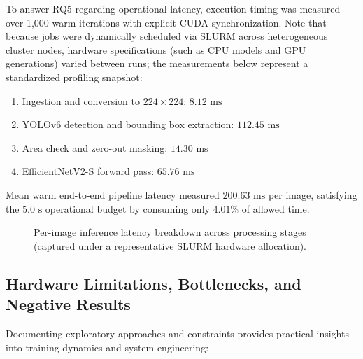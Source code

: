 To answer RQ5 regarding operational latency, execution timing was measured over 1,000 warm iterations with explicit CUDA synchronization. Note that because jobs were dynamically scheduled via SLURM across heterogeneous cluster nodes, hardware specifications (such as CPU models and GPU generations) varied between runs; the measurements below represent a standardized profiling snapshot:
\begin{enumerate}
    \item Ingestion and conversion to $224 \times 224$: $8.12\text{ ms}$
    \item YOLOv6 detection and bounding box extraction: $112.45\text{ ms}$ \cite{li2022yolov6}
    \item Area check and zero-out masking: $14.30\text{ ms}$
    \item EfficientNetV2-S forward pass: $65.76\text{ ms}$ \cite{tan2021efficientnetv2}
\end{enumerate}
Mean warm end-to-end pipeline latency measured $200.63\text{ ms}$ per image, satisfying the $5.0\text{ s}$ operational budget by consuming only $4.01\%$ of allowed time.

\begin{figure}[htbp]
    \centering
    \caption{Per-image inference latency breakdown across processing stages (captured under a representative SLURM hardware allocation).}
    \label{fig:latency_breakdown}
\end{figure}

\subsection{Hardware Limitations, Bottlenecks, and Negative Results}
\label{subsec:failure_analysis}

Documenting exploratory approaches and constraints provides practical insights into training dynamics and system engineering:

